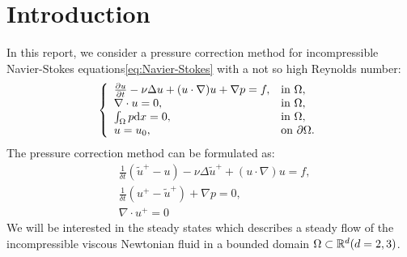 \section{Introduction}
In this report, we consider a pressure correction method for incompressible Navier-Stokes equations\eqref{eq:Navier-Stokes} 
with a not so high Reynolds number:
\begin{equation}\label{eq:Navier-Stokes}
  \left\{
    \begin{array}{ll}
      \frac{\partial u}{\partial t}-\nu\Delta u+(u\cdot\nabla)u+\nabla p=f, & \text{in } \Omega, \\
      \nabla\cdot u=0,                         & \text{in } \Omega, \\
      \int_\Omega p\mathrm{d} x = 0,                 & \text{in } \Omega, \\
      u = u_0,                                  & \text{on } \partial\Omega.
    \end{array}
    \right.
\end{equation}
The pressure correction method can be formulated as:
\begin{equation}\label{eq:iter}
  \begin{split}
    & \frac{1}{\delta t}(\tilde{u}^+-u)-\nu\Delta \tilde{u}^++(u\cdot\nabla)u=f, \\
    & \frac{1}{\delta t}(u^+-\tilde{u}^+)+\nabla p=0, \\
    & \nabla\cdot u^+=0
  \end{split}
\end{equation}
We will be interested in the steady states which describes 
a steady flow of the incompressible viscous Newtonian fluid 
in a bounded domain $\Omega\subset\mathbb{R}^d(d=2,3)$. 

